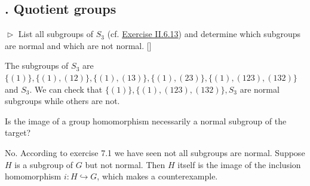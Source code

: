 \documentclass[12pt,letterpaper,boxed]{hmcpset}
\begin{document}
\begin{solution}
\begin{center}
\end{center}
\begin{center}
\end{center}

\end{solution}	


\subsection{. Quotient groups}
\begin{problem}[7.1]
$\vartriangleright$ List all subgroups of $S_3$ (cf. \hyperlink{Exercise II.6.13}{Exercise II.6.13}) and determine which subgroups are normal and which are not normal. []
\end{problem}
\begin{solution}
	The subgroups of $S_3$ are $\{(1)\},\{(1),(12)\},\{(1),(13)\},\{(1),(23)\},\{(1),(123),(132)\}$ and $S_3$. We can check that $\{(1)\},\{(1),(123),(132)\},S_3$ are normal subgroups while others are not.
\end{solution}	

\begin{problem}[7.2]
Is the image of a group homomorphism necessarily a normal subgroup of the target?
\end{problem}
\begin{solution}
No. According to exercise 7.1 we have seen not all subgroups are normal. Suppose $H$ is a subgroup of $G$ but not normal. Then $H$ itself is the image of the inclusion homomorphism $i:H\hookrightarrow G$, which makes a counterexample.   
\end{solution}
\end{document}
